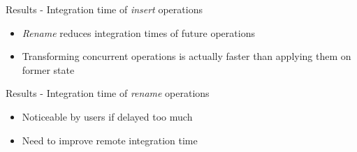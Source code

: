 \documentclass[10pt]{beamer}
\begin{document}
\begin{frame}{Results - Integration time of \emph{insert} operations}
  \vspace{-1\baselineskip}
  \begin{itemize}
    \item<2-> \emph{Rename} reduces integration times of future operations
    \item<3> Transforming concurrent operations is actually faster than applying them on former state
  \end{itemize}

\end{frame}

\begin{frame}{Results - Integration time of \emph{rename} operations}
  \begin{table}[!ht]
      \centering
      \caption{Integration time of rename operations}
  \end{table}

  \begin{itemize}
    \item<2-> Noticeable by users if delayed too much
    \item<3> Need to improve remote integration time
  \end{itemize}
\end{frame}
\end{document}

